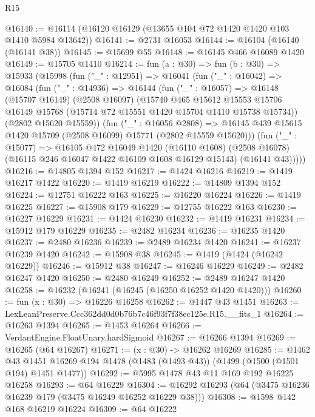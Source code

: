 \begin{lexlean}{R15}
\begin{coremodule}
@16140 := @16114 (@16120 @16129 (@13655 @104 @72 @1420 @1420 @103 @1410 @5984 @13642))
@16141 := @2731 @16053
@16144 := @16104 (@16140 (@16141 @38))
@16145 := @15699 @55
@16148 := @16145 @466 @16089 @1420
@16149 := @15705 @1410
@16214 := fun (a : @30) =>
  fun (b : @30) =>
  @15933
    (@15998
      (fun ("_" : @12951) =>
      @16041
        (fun ("_" : @16042) =>
        @16084
          (fun ("_" : @14936) =>
          @16144
            (fun ("_" : @16057) =>
            @16148
              (@15707 @16149)
              (@2508 @16097)
              (@15740
                @465
                @15612
                @15553
                @15706
                @16149
                @15768
                (@15714 @72 @15551 @1420 @15704 @1410 @15738 @15734))
              (@2802 @15620 @15559))
            (fun ("_" : @16056 @2808) =>
            @16145 @439 @15615 @1420 @15709 (@2508 @16099) @15771 (@2802 @15559 @15620)))
          (fun ("_" : @15077) =>
          @16105
            @472
            @16049
            @1420
            (@16110 @1608)
            (@2508 @16078)
            (@16115 @246 @16047 @1422 @16109 @1608 @16129 @15143)
            (@16141 @43)))))
@16216 := @14805 @1394 @152
@16217 := @1424 @16216
@16219 := @1419 @16217 @1422
@16220 := @1419 @16219
@16222 := @14809 @1394 @152
@16224 := @12751 @16222 @163
@16225 := @16220 @16224
@16226 := @1419 @16225
@16227 := @15908 @179
@16229 := @12755 @16222 @163
@16230 := @16227 @16229
@16231 := @1424 @16230
@16232 := @1419 @16231
@16234 := @15912 @179 @16229
@16235 := @2482 @16234
@16236 := @16235 @1420
@16237 := @2480 @16236
@16239 := @2489 @16234 @1420
@16241 := @16237 @16239 @1420
@16242 := @15908 @38
@16245 := @1419 (@1424 (@16242 @16229))
@16246 := @15912 @38
@16247 := @16246 @16229
@16249 := @2482 @16247 @1420
@16250 := @2480 @16249
@16252 := @2489 @16247 @1420
@16258 := @16232 (@16241 (@16245 (@16250 @16252 @1420 @1420)))
@16260 := fun (x : @30) => @16226 @16258
@16262 := @1447 @43 @1451
@16263 := LexLeanPreserve.Ccc362dd0d0b76b7c46f93f7f38ec125e.R15.__fits_1
@16264 := @16263 @1394
@16265 := @1453 @16264
@16266 := VerdantEngine.FloatUnary.hardSigmoid
@16267 := @16266 @1394
@16269 := @16265 (@64 @16267)
@16271 := (x : @30) -> @16262 @16269
@16285 := @1462
    @43
    @1451
    @16269
    @194
    @1478
    (@1483 (@1493 @43))
    (@1499 (@1500 (@1501 @194) @1451 @1477))
@16292 := @5995 @1478 @43 @11 @169 @192 @16225 @16258
@16293 := @64 @16229
@16304 := @16292 @16293 (@64 (@3475 @16236 @16239 @179 (@3475 @16249 @16252 @16229 @38)))
@16308 := @1598 @142 @168 @16219 @16224
@16309 := @64 @16222

\end{coremodule}
\end{lexlean}
